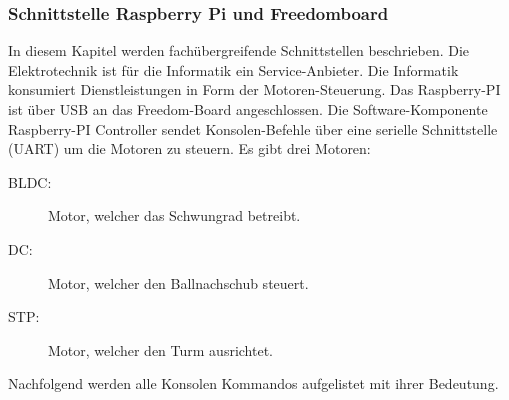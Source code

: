 \subsubsection{Schnittstelle Raspberry Pi und Freedomboard}
\label{sec:schnittstelle-raspi-freedom}
In diesem Kapitel werden fachübergreifende Schnittstellen beschrieben.
Die Elektrotechnik ist für die Informatik ein Service-Anbieter. Die
Informatik konsumiert Dienstleistungen in Form der Motoren-Steuerung.
Das Raspberry-PI ist über USB an das Freedom-Board angeschlossen. Die
Software-Komponente Raspberry-PI Controller sendet Konsolen-Befehle
über eine serielle Schnittstelle (UART) um die Motoren zu steuern. Es
gibt drei Motoren:

\begin{description}
	\item[BLDC:] Motor, welcher das Schwungrad betreibt.
	\item[DC:] Motor, welcher den Ballnachschub steuert.
	\item[STP:] Motor, welcher den Turm ausrichtet.
\end{description}

\noindent
Nachfolgend werden alle Konsolen Kommandos aufgelistet mit ihrer
Bedeutung. \\

